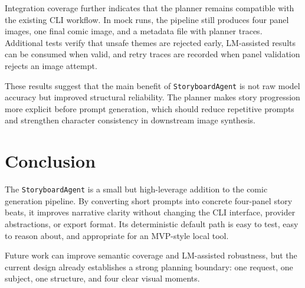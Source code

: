 \documentclass[11pt]{article}
\begin{document}
Integration coverage further indicates that the planner remains compatible with the existing CLI workflow. In mock runs, the pipeline still produces four panel images, one final comic image, and a metadata file with planner traces. Additional tests verify that unsafe themes are rejected early, LM-assisted results can be consumed when valid, and retry traces are recorded when panel validation rejects an image attempt.

These results suggest that the main benefit of \texttt{StoryboardAgent} is not raw model accuracy but improved structural reliability. The planner makes story progression more explicit before prompt generation, which should reduce repetitive prompts and strengthen character consistency in downstream image synthesis.

\section{Conclusion}
The \texttt{StoryboardAgent} is a small but high-leverage addition to the comic generation pipeline. By converting short prompts into concrete four-panel story beats, it improves narrative clarity without changing the CLI interface, provider abstractions, or export format. Its deterministic default path is easy to test, easy to reason about, and appropriate for an MVP-style local tool.

Future work can improve semantic coverage and LM-assisted robustness, but the current design already establishes a strong planning boundary: one request, one subject, one structure, and four clear visual moments.
\end{document}
